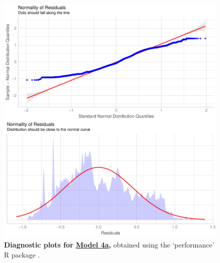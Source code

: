 \newpage


\begin{figure}[h!]
\centering
\includegraphics[scale=0.7]{Supporting/Chapter3/Figures/Diagnostics/Diag_model_4a}
\caption[Diagnostic plots for Model 4a]{\textbf{Diagnostic plots for \underline{Model 4a},} obtained using the `performance' R package \citep{performance}.}
\label{}
\end{figure}

\newpage

